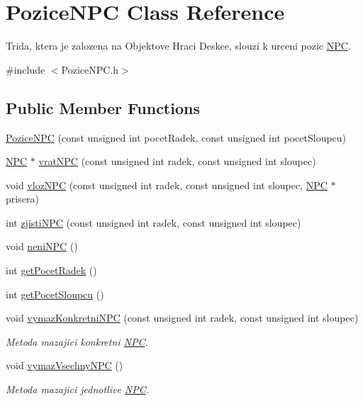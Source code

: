 \hypertarget{class_pozice_n_p_c}{\section{Pozice\-N\-P\-C Class Reference}
\label{class_pozice_n_p_c}
}


Trida, ktera je zalozena na Objektove Hraci Deskce, slouzi k urceni pozic \hyperlink{class_n_p_c}{N\-P\-C}.  




{\ttfamily \#include $<$Pozice\-N\-P\-C.\-h$>$}

\subsection*{Public Member Functions}
\begin{DoxyCompactItemize}
\item 
\hyperlink{class_pozice_n_p_c_a7b892d976ad655a51a2f474fe781953e}{Pozice\-N\-P\-C} (const unsigned int pocet\-Radek, const unsigned int pocet\-Sloupcu)
\item 
\hyperlink{class_n_p_c}{N\-P\-C} $\ast$ \hyperlink{class_pozice_n_p_c_ab5170759c36b5501c76ccb854300cf2b}{vrat\-N\-P\-C} (const unsigned int radek, const unsigned int sloupec)
\item 
void \hyperlink{class_pozice_n_p_c_ac7ae9429337b624e12a4ad573aa1ba41}{vloz\-N\-P\-C} (const unsigned int radek, const unsigned int sloupec, \hyperlink{class_n_p_c}{N\-P\-C} $\ast$prisera)
\item 
int \hyperlink{class_pozice_n_p_c_a5378b7fe08b482803bc26c34b17bf417}{zjisti\-N\-P\-C} (const unsigned int radek, const unsigned int sloupec)
\item 
void \hyperlink{class_pozice_n_p_c_aa30ffc5f378c76ca8c824412ae17456d}{neni\-N\-P\-C} ()
\item 
int \hyperlink{class_pozice_n_p_c_a9116541c763f65ea2862c94dc7a2fabf}{get\-Pocet\-Radek} ()
\item 
int \hyperlink{class_pozice_n_p_c_a0674a8f721ed8f362a466316672bf3ec}{get\-Pocet\-Sloupcu} ()
\item 
\hypertarget{class_pozice_n_p_c_a3af75bf27301043a3449bd6b0e652fd2}{void \hyperlink{class_pozice_n_p_c_a3af75bf27301043a3449bd6b0e652fd2}{vymaz\-Konkretni\-N\-P\-C} (const unsigned int radek, const unsigned int sloupec)}\label{class_pozice_n_p_c_a3af75bf27301043a3449bd6b0e652fd2}

\begin{DoxyCompactList}\small\item\em Metoda mazajici konkretni \hyperlink{class_n_p_c}{N\-P\-C}. \end{DoxyCompactList}\item 
void \hyperlink{class_pozice_n_p_c_ae30c9177e3a992d7677f632fe961e8d7}{vymaz\-Vsechny\-N\-P\-C} ()
\begin{DoxyCompactList}\small\item\em Metoda mazajici jednotlive \hyperlink{class_n_p_c}{N\-P\-C}. \end{DoxyCompactList}\end{DoxyCompactItemize}


